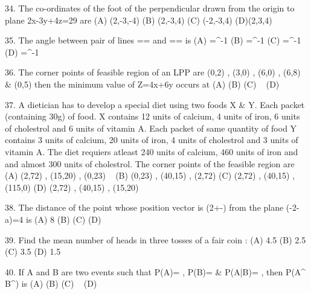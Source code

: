 34. The co-ordinates of the foot of the perpendicular drawn from the origin to plane 2x-3y+4z=29 are
(A) (2,-3,-4) \qquad \qquad \qquad \qquad \qquad (B) (2,-3,4)
(C) (-2,-3,4) \qquad \qquad \qquad \qquad \qquad (D)(2,3,4)

35. The angle between pair of lines == and == is
(A) \theta=\cos^{-1}  \qquad \qquad \qquad \qquad \qquad (B) \theta=\cos^{-1} 
(C) \theta=\cos^{-1}  \qquad \qquad \qquad \qquad \qquad (D) \theta=\cos^{-1} 

36. The corner points of feasible region of an LPP are (0,2) , (3,0) , (6,0) , (6,8) & (0,5) then the minimum value of Z=4x+6y occurs at
(A)  \qquad \qquad \qquad (B) 
(C)  \qquad \qquad \qquad \qquad \qquad ~ (D) 

37. A dietician has to develop a special diet using two foods X & Y. Each packet (containing 30g) of food. X contains 12 units of calcium, 4 units of iron, 6 units of cholestrol and 6 units of vitamin A. Each packet of same quantity of food Y contains 3 units of calcium, 20 units of iron, 4 units of cholestrol and 3 units of vitamin A. The diet requiers atleast 240 units of calcium, 460 units of iron and and almost 300 units of cholestrol. The corner points of the feasible region are
(A) (2,72) , (15,20) , (0,23) \qquad \qquad \qquad \qquad \qquad ~ (B) (0,23) , (40,15) , (2,72)
(C) (2,72) , (40,15) , (115,0) \qquad \qquad \qquad \qquad \qquad (D) (2,72) , (40,15) , (15,20)

38. The distance of the point whose position vector is (2+-) from the plane \cdot(-2-a)=4 is
(A) 8 \qquad \qquad \qquad \qquad \qquad (B) 
(C)  \qquad \qquad \qquad \qquad \qquad \quad (D) 

39. Find the mean number of heads in three tosses of a fair coin :
(A) 4.5 \qquad \qquad \qquad \qquad \qquad (B) 2.5
(C) 3.5 \qquad \qquad \qquad \qquad \qquad (D) 1.5

40. If A and B are two events such that P(A)= , P(B)= & P(A|B)= , then P(A^{\prime } \cap B^{\prime}) is
(A)  \qquad \qquad \qquad \qquad \qquad (B) 
(C)  \qquad \qquad \qquad \qquad \qquad ~ (D) 

